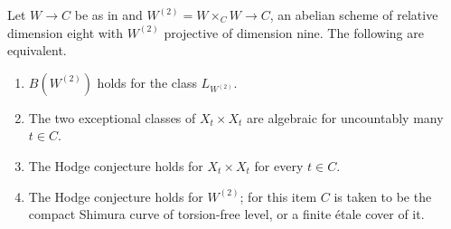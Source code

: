 \begin{corollary}\label{cor:mumfordequiv}
Let $W\to C$ be as in  and
$W^{(2)}=W\times_{C}W\to C$, an abelian scheme of relative dimension eight
with $W^{(2)}$ projective of dimension nine. The following are equivalent.
\begin{enumerate}[label=\textup{(\alph*)},leftmargin=2.6em,itemsep=2pt]
\item $B(W^{(2)})$ holds for the class $L_{W^{(2)}}$.
\item The two exceptional classes of $X_{t}\times X_{t}$ are algebraic for
  uncountably many $t\in C$.
\item The Hodge conjecture holds for $X_{t}\times X_{t}$ for every $t\in C$.
\item The Hodge conjecture holds for $W^{(2)}$; for this item $C$ is taken to
  be the compact Shimura curve of torsion-free level, or a finite \'etale
  cover of it.
\end{enumerate}
\end{corollary}

